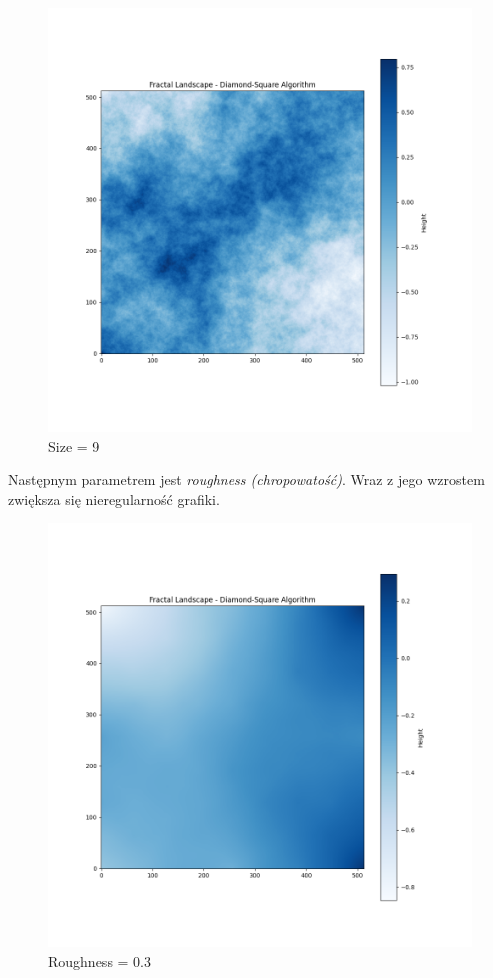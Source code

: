 \documentclass{article}
\begin{document}
\begin{figure}[H]
    \centering
    \includegraphics[width=0.7\linewidth]{Blues_9_0.7.png}
    \caption{Size = 9}
\end{figure}

\newpage

Następnym parametrem jest \textit{roughness (chropowatość)}. Wraz z jego wzrostem zwiększa się nieregularność grafiki. 

\begin{figure}[H]
    \centering
    \includegraphics[width=0.7\linewidth]{Blues_9_0.3.png}
    \caption{Roughness = 0.3}
\end{figure}
\end{document}

